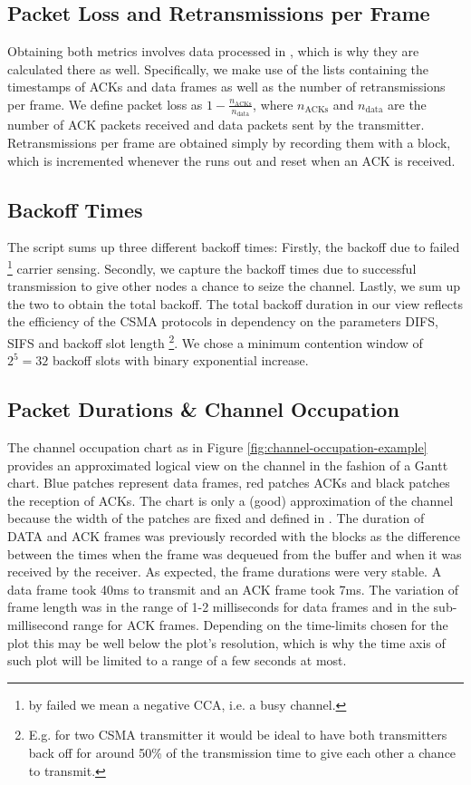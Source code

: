 \subsection{Packet Loss and Retransmissions per Frame}

Obtaining both metrics involves data processed in , which is why they are calculated there as well. Specifically, we make use of the lists containing the timestamps of ACKs and data frames as well as the number of retransmissions per frame. 
We define packet loss as $ 1 - \frac{n_\text{ACKs}}{n_\text{data}} $, where $ n_\text{ACKs} $ and $ n_\text{data} $ are the number of ACK packets received and data packets sent by the transmitter.
Retransmissions per frame are obtained simply by recording them with a  block, which is incremented whenever the  runs out and reset when an ACK is received.

\subsection{Backoff Times}

The script  sums up three different backoff times: Firstly, the backoff due to failed \footnote{by failed we mean a negative CCA, i.e. a busy channel.} carrier sensing. Secondly, we capture the backoff times due to successful transmission to give other nodes a chance to seize the channel. Lastly, we sum up the two to obtain the total backoff. The total backoff duration in our view reflects the efficiency of the CSMA protocols in dependency on the parameters DIFS, SIFS and backoff slot length \footnote{E.g. for two CSMA transmitter it would be ideal to have both transmitters back off for around 50\% of the transmission time to give each other a chance to transmit.}. We chose a minimum contention window of $2^5=32$ backoff slots with binary exponential increase. 

\subsection{Packet Durations \& Channel Occupation}

The channel occupation chart as in Figure \ref{fig:channel-occupation-example} provides an approximated logical view on the channel in the fashion of a Gantt chart. Blue patches represent data frames, red patches ACKs and black patches the reception of ACKs. The chart is only a (good) approximation of the channel because the width of the patches are fixed and defined in . The duration of DATA and ACK frames was previously recorded with the  blocks as the difference between the times when the frame was dequeued from the buffer and when it was received by the receiver. As expected, the frame durations were very stable. A data frame took 40ms to transmit and an ACK frame took 7ms. The variation of frame length was in the range of 1-2  milliseconds for data frames and in the sub-millisecond range for ACK frames. Depending on the time-limits chosen for the plot this may be well below the plot's resolution, which is why the time axis of such plot will be limited to a range of a few seconds at most.

